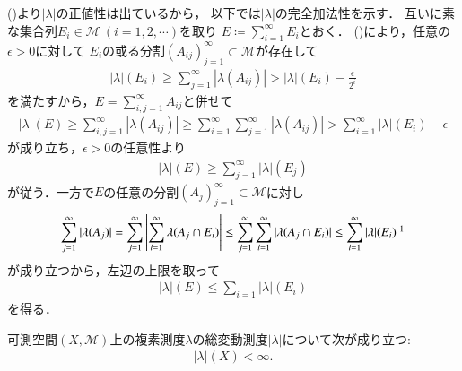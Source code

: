 	\begin{prf}
		()より$|\lambda|$の正値性は出ているから，
		以下では$|\lambda|$の完全加法性を示す．
		互いに素な集合列$E_i \in \mathcal{M}\ (i=1,2,\cdots)$を取り
		$E \coloneqq \sum_{i=1}^{\infty} E_i$とおく．
		()により，任意の$\epsilon > 0$に対して
		$E_i$の或る分割$(A_{ij})_{j=1}^{\infty} \subset \mathcal{M}$が存在して
		\begin{align}
			|\lambda|(E_i) \geq \sum_{j=1}^{\infty} |\lambda(A_{ij})| 
			> |\lambda|(E_i) - \frac{\epsilon}{2^i}
		\end{align}
		を満たすから，$E = \sum_{i,j=1}^{\infty} A_{ij}$と併せて
		\begin{align}
			|\lambda|(E) \geq \sum_{i,j=1}^{\infty} |\lambda(A_{ij})| \geq \sum_{i=1}^{\infty}\sum_{j=1}^{\infty} |\lambda(A_{ij})| > \sum_{i=1}^{\infty} |\lambda|(E_i) - \epsilon
		\end{align}
		が成り立ち，$\epsilon > 0$の任意性より
		\begin{align}
			|\lambda|(E) \geq \sum_{j=1}^{\infty} |\lambda|(E_j)
		\end{align}
		が従う．一方で$E$の任意の分割$(A_j)_{j=1}^{\infty} \subset \mathcal{M}$に対し
		\begin{align}
			\sum_{j=1}^{\infty} |\lambda(A_j)| 
			= \sum_{j=1}^{\infty} \left| \sum_{i=1}^{\infty} \lambda(A_j \cap E_i) \right|
			\leq \sum_{j=1}^{\infty} \sum_{i=1}^{\infty} |\lambda(A_j \cap E_i)|
			\leq \sum_{i=1}^{\infty} |\lambda|(E_i)
			\ \footnotemark
		\end{align}
		が成り立つから，左辺の上限を取って
		\begin{align}
			|\lambda|(E) \leq \sum_{i=1} |\lambda|(E_i)
		\end{align}
		を得る．
		\QED
	\end{prf}
	
	\begin{itembox}[l]{}	
		\begin{thm}[総変動測度は有界]
			可測空間$(X,\mathcal{M})$上の複素測度$\lambda$の総変動測度$|\lambda|$について次が成り立つ:
			\begin{align}
				|\lambda|(X) < \infty.
			\end{align}
			\label{thm:total_variation_measure_bounded}
		\end{thm}
	\end{itembox}
	
